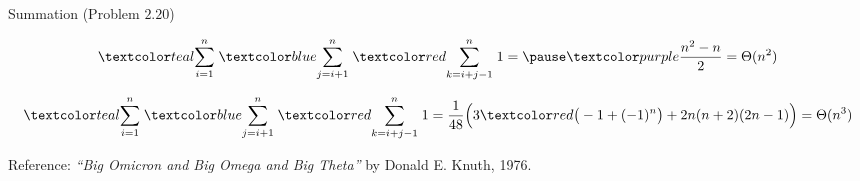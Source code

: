 \begin{frame}{}
  \begin{exampleblock}{Summation (Problem $2.20$)}
    \vspace{-0.30cm}
    
  \end{exampleblock}

  \pause
  \[
    \teal{\sum_{i=1}^{n}}\; \blue{\sum_{j=i+1}^{n}}\; \red{\sum_{k=i+j-1}^{n}}\; 1 = \pause \purple{\frac{n^2-n}{2}} = \Theta(n^2)
  \]

  \pause
  \vspace{-0.50cm}
  \[
    \teal{\sum_{i=1}^{n}}\; \blue{\sum_{j=i+1}^{n}}\; \red{\sum_{k=i+j-1}^{n}}\; 1 = \frac{1}{48} \Big(3 \red{\big(-1 + (-1)^n \big)} + 2n (n+2) (2n-1)\Big) = \Theta(n^3)
  \]
\end{frame}

\begin{frame}{}
\end{frame}

\begin{frame}{}

  \begin{alertblock}{Reference:}
    {\it ``Big Omicron and Big Omega and Big Theta''} by Donald E. Knuth, 1976.
  \end{alertblock}
\end{frame}
